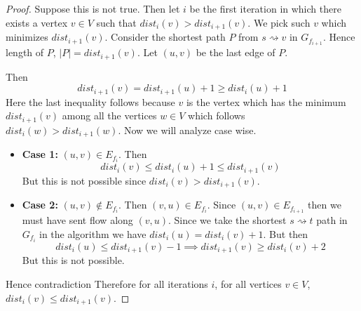 \begin{proof}
	Suppose this is not true. Then let $i$ be the first iteration in which there exists a vertex $v\in V$ such that $\textit{dist}_i(v)>\textit{dist}_{i+1}(v)$. We pick such $v$ which minimizes $\textit{dist}_{i+1}(v)$. Consider the shortest path $P$ from $s\rightsquigarrow v$ in $G_{f_{i+1}}$. Hence length of $P$, $|P|=\textit{dist}_{i+1}(v)$. Let $(u,v)$ be the last edge of $P$.
	\begin{center}
	\end{center}
	Then $$\textit{dist}_{i+1}(v)=\textit{dist}_{i+1}(u)+1\geq \textit{dist}_i(u)+1$$Here the last inequality follows because $v$ is the vertex which has the minimum $\textit{dist}_{i+1}(v)$ among all the vertices $w\in V$ which follows $\textit{dist}_i(w)>\textit{dist}_{i+1}(w)$. Now we will analyze case wise.\begin{itemize}
		\item \textbf{Case 1:} $(u,v)\in E_{f_i}$. Then $$\textit{dist}_i(v)\leq \textit{dist}_{i}(u)+1\leq \textit{dist}_{i+1}(v)$$But this is not possible since $\textit{dist}_i(v)>\textit{dist}_{i+1}(v)$.
		\item \textbf{Case 2:} $(u,v)\notin E_{f_i}$. Then $(v,u)\in E_{f_i}$. Since $(u,v)\in E_{f_{i+1}}$ then we must have sent flow along $(v,u)$. Since we take the shortest $s\rightsquigarrow t$ path in $G_{f_i}$ in the algorithm we have $\textit{dist}_i(u)=\textit{dist}_i(v)+1$. But then $$\textit{dist}_i(u)\leq \textit{dist}_{i+1}(v)-1\implies \textit{dist}_{i+1}(v)\geq \textit{dist}_i(v)+2$$But this is not possible.
	\end{itemize}
	Hence contradiction \ctr Therefore for all iterations $i$, for all vertices $v\in V$, $\textit{dist}_i(v)\leq \textit{dist}_{i+1}(v)$.
\end{proof}

